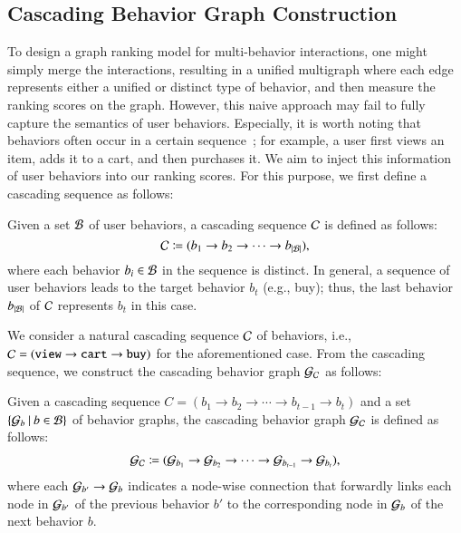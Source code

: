 \subsection{Cascading Behavior Graph Construction}
\label{sec:proposed:cbg}

To design a graph ranking model for multi-behavior interactions, one might simply merge the interactions, resulting in a unified multigraph where each edge represents either a unified or distinct type of behavior, and then measure the ranking scores on the graph. 
However, this naive approach may fail to fully capture the semantics of user behaviors. 
Especially, it is worth noting that behaviors often occur in a certain sequence~\cite{LiuXWY00024, yin2024hecgcn, ChengCHLZGP23fqvn, YanCGSLSL24}; for example, a user first views an item, adds it to a cart, and then purchases it.
We aim to inject this information of user behaviors into our ranking scores. 
%
For this purpose, we first define a cascading sequence as follows:
\begin{definition}
\label{def:cascading_sequence}
Given a set $\mathcal{B}$ of user behaviors, a cascading sequence $\mathcal{C}$ is defined as follows:
\begin{equation*}
    \mathcal{C} \coloneqq (b_1 \rightarrow b_2 \rightarrow \cdots \rightarrow b_{|\mathcal{B}|}), 
\end{equation*}
where each behavior $b_{i} \in \mathcal{B}$ in the sequence is distinct. 
In general, a sequence of user behaviors leads to the target behavior $b_t$ (e.g., buy); thus, the last behavior $b_{|\mathcal{B}|}$ of $\mathcal{C}$ represents $b_t$ in this case.
\hfill\qedsymbol
\end{definition}

We consider a natural cascading sequence $\mathcal{C}$ of behaviors, i.e., $\mathcal{C} = (\texttt{view} \rightarrow \texttt{cart} \rightarrow \texttt{buy})$ for the aforementioned case. 
From the cascading sequence, we construct the cascading behavior graph $\mathcal{G}_{\mathcal{C}}$ as follows:
\begin{definition}
Given a cascading sequence $C = (b_1 \rightarrow b_2 \rightarrow \cdots \rightarrow b_{t-1} \rightarrow b_t)$ and a set $\{\mathcal{G}_{b} \: | \: b \in \mathcal{B} \}$ of behavior graphs, the cascading behavior graph $\mathcal{G}_{\mathcal{C}}$ is defined as follows:
\begin{align}
    \label{eq:cbg}
    \mathcal{G}_{\mathcal{C}} \coloneqq (\mathcal{G}_{b_1} \rightarrow \mathcal{G}_{b_2} \rightarrow \cdots \rightarrow
    \mathcal{G}_{b_{t-1}} \rightarrow \mathcal{G}_{b_t}), 
\end{align}
where each $\mathcal{G}_{b'} \rightarrow \mathcal{G}_{b}$ indicates a node-wise connection that forwardly links each node in $\mathcal{G}_{b'}$ of the previous behavior $b'$ to the corresponding node in  $\mathcal{G}_{b}$ of the next behavior $b$.
\hfill\qedsymbol
\end{definition}

